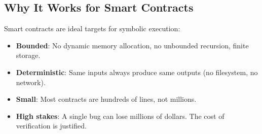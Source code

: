 \subsection{Why It Works for Smart Contracts}

Smart contracts are ideal targets for symbolic execution:

\begin{itemize}[nosep]
  \item \textbf{Bounded}: No dynamic memory allocation, no unbounded recursion, finite
    storage.
  \item \textbf{Deterministic}: Same inputs always produce same outputs (no filesystem,
    no network).
  \item \textbf{Small}: Most contracts are hundreds of lines, not millions.
  \item \textbf{High stakes}: A single bug can lose millions of dollars. The cost of
    verification is justified.
\end{itemize}

